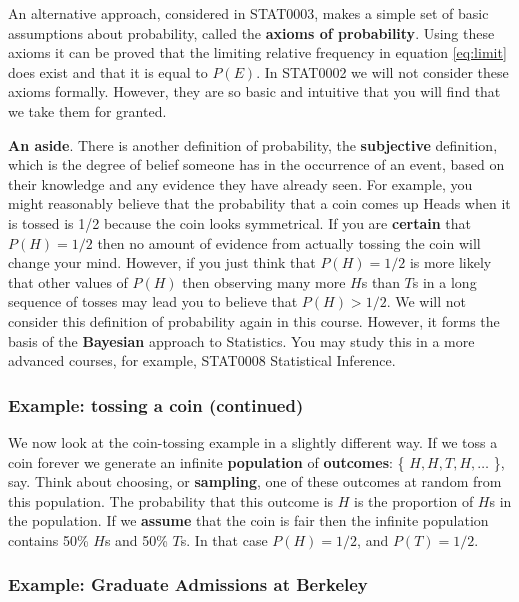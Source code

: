 \documentclass[
  british,
  11pt,
  openany, a4paper]{book}
\begin{document}
An alternative approach, considered in STAT0003, makes a simple set of basic assumptions about probability, called the \textbf{axioms of probability}. Using these axioms it can be proved that the limiting relative frequency in equation \eqref{eq:limit} does exist and that it is equal to \(P(E)\). In STAT0002 we will not consider these axioms formally. However, they are so basic and intuitive that you will find that we take them for granted.

\textbf{An aside}. There is another definition of probability, the \textbf{subjective} definition, which is the degree of belief someone has in the occurrence of an event, based on their knowledge and any evidence they have already seen. For example, you might reasonably believe that the probability that a coin comes up Heads when it is tossed is 1/2 because the coin looks symmetrical. If you are \textbf{certain} that \(P(H)=1/2\) then no amount of evidence from actually tossing the coin will change your mind. However, if you just think that \(P(H)=1/2\) is more likely that other values of \(P(H)\) then observing many more \(H\)s than \(T\)s in a long sequence of tosses may lead you to believe that \(P(H)>1/2\). We will not consider this definition of probability again in this course. However, it forms the basis of the \textbf{Bayesian} approach to Statistics. You may study this in a more advanced courses, for example, STAT0008 Statistical Inference.

\subsubsection*{Example: tossing a coin (continued)}\label{example-tossing-a-coin-continued}

We now look at the coin-tossing example in a slightly different way. If we toss a coin forever we generate an infinite \textbf{population} of \textbf{outcomes}: \{ \(H,H,T,H,\ldots\) \}, say. Think about choosing, or \textbf{sampling}, one of these outcomes at random from this population. The probability that this outcome is \(H\) is the proportion of \(H\)s in the population. If we \textbf{assume} that the coin is fair then the infinite population contains 50\% \(H\)s and 50\% \(T\)s. In that case \(P(H)=1/2\), and \(P(T)=1/2\).

\subsubsection*{Example: Graduate Admissions at Berkeley}\label{example-graduate-admissions-at-berkeley}
\end{document}
